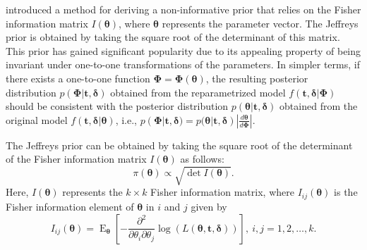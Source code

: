 \documentclass[12pt]{article} %
\newcommand{\f}{\operatorname}
\theoremstyle{plain}%
\theoremstyle{definition}
\theoremstyle{remark}
\begin{document}
\cite{jeffreys1946invariant} introduced a method for deriving a non-informative prior that relies on the Fisher information matrix $I(\boldsymbol{\theta})$, where $\boldsymbol{\theta}$ represents the parameter vector. The Jeffreys prior is obtained by taking the square root of the determinant of this matrix. This prior has gained significant popularity due to its appealing property of being invariant under one-to-one transformations of the parameters. In simpler terms, if there exists a one-to-one function $\boldsymbol{\Phi}=\boldsymbol{\Phi}(\boldsymbol{\theta})$, the resulting posterior distribution $p(\boldsymbol{\Phi}|\boldsymbol{t,\delta})$ obtained from the reparametrized model $f(\boldsymbol{t,\delta}|\boldsymbol{\Phi})$ should be consistent with the posterior distribution $p(\boldsymbol{\theta}|\boldsymbol{t,\delta})$ obtained from the original model $f(\boldsymbol{t,\delta}|\boldsymbol{\theta})$, i.e., $p(\boldsymbol{\Phi}|\boldsymbol{t,\delta})=p(\boldsymbol{\theta}|\boldsymbol{t,\delta})|\frac{d\boldsymbol{\theta}}{d\boldsymbol{\Phi}}|$.

The Jeffreys prior can be obtained by taking the square root of the determinant of the Fisher information matrix $I(\boldsymbol{\theta})$ as follows:
\begin{equation}\label{jeffreysp} 
\pi(\boldsymbol{\theta})\propto \sqrt{\det I(\boldsymbol{\theta})}.
\end{equation}
Here, $I(\boldsymbol{\theta})$ represents the $k\times k$ Fisher information matrix, where $I_{ij}(\boldsymbol{\theta})$ is the Fisher information element of $\boldsymbol{\theta}$ in $i$ and $j$  given by
\begin{equation*}%
I_{ij}(\boldsymbol{\theta})=\f{E}_{\boldsymbol{\theta}}\left[-\frac{\partial^2}{\partial \theta_i \partial \theta_j}\log(L(\boldsymbol{\theta},\boldsymbol{t,\delta}))\right],\ i,j=1,2,\ldots,k.
\end{equation*}
\end{document}
